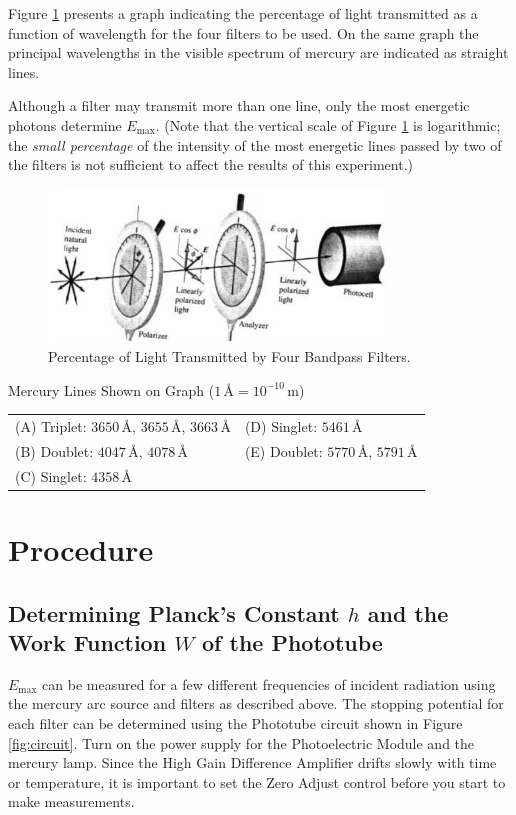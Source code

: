 Figure {\ref{fig:bandpass}} presents a graph indicating the percentage of light transmitted as a function of wavelength for the four filters to be used. On the same graph the principal wavelengths in the visible spectrum of mercury are indicated as straight lines.\myskip

 Although a filter may transmit more than one line, only the most energetic photons determine $E_{\mathrm{max}}$. (Note that the vertical scale of Figure {\ref{fig:bandpass}} is logarithmic; the \emph{small percentage} of the intensity of the most energetic lines passed by two of the filters is not sufficient to affect the results of this experiment.)

\begin{figure}[h]
\centering
\includegraphics[width=0.8\textwidth]{./Exp8/pic/image7.png}
\caption{Percentage of Light Transmitted by Four Bandpass Filters.}
\label{fig:bandpass}
\end{figure} 

Mercury Lines Shown on Graph ($1\,\text{\AA} = 10^{-10}\, \mathrm{m}$)
\begin{table}[h]
  \centering
  \begin{tabular}{ll}
(A) Triplet: $3650\, \text{\AA}$, $3655\, \text{\AA}$, $3663\, \text{\AA}$&(D) Singlet: $5461\, \text{\AA}$\\
(B) Doublet: $4047\, \text{\AA}$, $4078\, \text{\AA}$&(E) Doublet: $5770\, \text{\AA}$, $5791\, \text{\AA}$\\
(C) Singlet: $4358\, \text{\AA}$&    
  \end{tabular}
\end{table}

\section{Procedure}
\subsection{Determining Planck's Constant $h$ and the Work Function $W$ of the Phototube}
$E_{\mathrm{max}}$ can be measured for a few different frequencies of incident radiation using the mercury arc source and filters as described above. The stopping potential for each filter can be determined using the Phototube circuit shown in Figure {\ref{fig:circuit}}. Turn on the power supply for the Photoelectric Module and the mercury lamp. Since the High Gain Difference Amplifier drifts slowly with time or temperature, it is important to set the Zero Adjust control before you start to make measurements.\myskip

